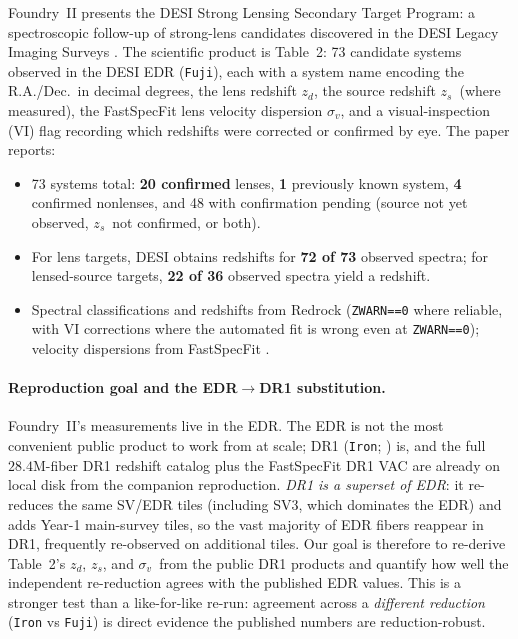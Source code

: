 \documentclass[11pt,letterpaper]{article}
\newcommand{\sigmav}{\ensuremath{\sigma_v}}
\newcommand{\zd}{\ensuremath{z_d}}
\newcommand{\zs}{\ensuremath{z_s}}
\begin{document}
Foundry~II presents the DESI Strong Lensing Secondary Target Program: a
spectroscopic follow-up of strong-lens candidates discovered in the DESI Legacy
Imaging Surveys \citep{huang2020decals, storfer2024}. The scientific product is
\citet{huang2025foundry2} Table~2: 73 candidate systems observed in the DESI EDR
(\texttt{Fuji}), each with a system name encoding the R.A./Dec.\ in decimal
degrees, the lens redshift \zd, the source redshift \zs\ (where measured), the
FastSpecFit lens velocity dispersion \sigmav, and a visual-inspection (VI) flag
recording which redshifts were corrected or confirmed by eye. The paper reports:

\begin{itemize}
\item 73 systems total: \textbf{20 confirmed} lenses, \textbf{1} previously
      known system, \textbf{4} confirmed nonlenses, and 48 with confirmation
      pending (source not yet observed, \zs\ not confirmed, or both).
\item For lens targets, DESI obtains redshifts for \textbf{72 of 73} observed
      spectra; for lensed-source targets, \textbf{22 of 36} observed spectra
      yield a redshift.
\item Spectral classifications and redshifts from Redrock (\texttt{ZWARN==0}
      where reliable, with VI corrections where the automated fit is wrong even
      at \texttt{ZWARN==0}); velocity dispersions from FastSpecFit
      \citep{moustakas2023fastspecfit}.
\end{itemize}

\paragraph{Reproduction goal and the EDR$\to$DR1 substitution.}
Foundry~II's measurements live in the EDR. The EDR is not the most convenient
public product to work from at scale; DR1 (\texttt{Iron};
\citealt{desidr1}) is, and the full $28.4$M-fiber DR1 redshift catalog plus the
FastSpecFit DR1 VAC are already on local disk from the companion
\citet{hsu2025pairwise} reproduction. \emph{DR1 is a superset of EDR}: it
re-reduces the same SV/EDR tiles (including SV3, which dominates the EDR) and
adds Year-1 main-survey tiles, so the vast majority of EDR fibers reappear in
DR1, frequently re-observed on additional tiles. Our goal is therefore to
re-derive Table~2's \zd, \zs, and \sigmav\ from the public DR1 products and
quantify how well the independent re-reduction agrees with the published EDR
values. This is a stronger test than a like-for-like re-run: agreement across a
\emph{different reduction} (\texttt{Iron} vs \texttt{Fuji}) is direct evidence
the published numbers are reduction-robust.
\end{document}
